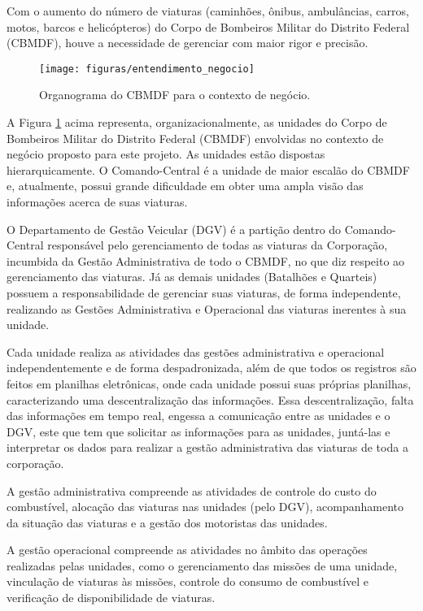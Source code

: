   Com o aumento do número de viaturas (caminhões, ônibus, ambulâncias, carros, motos, barcos e helicópteros) do Corpo de 
  Bombeiros Militar do Distrito Federal (CBMDF), houve a necessidade de gerenciar com maior rigor e precisão.

  \begin{figure}[!htbp]
    \centering
    \texttt{[image: figuras/entendimento\_negocio]}
    \caption{Organograma do CBMDF para o contexto de negócio.}
    \label{entendimento_negocio}
  \end{figure}
  
  A Figura \ref{entendimento_negocio} acima representa, organizacionalmente, as unidades do Corpo de Bombeiros Militar do Distrito Federal (CBMDF)
  envolvidas no contexto de negócio proposto para este projeto. As unidades estão dispostas hierarquicamente. 
  O Comando-Central é a unidade de maior escalão do CBMDF e, atualmente, possui grande dificuldade em obter uma ampla 
  visão das informações acerca de suas viaturas.
  
  O Departamento de Gestão Veicular (DGV) é a partição dentro do Comando-Central responsável pelo gerenciamento de todas 
  as viaturas da Corporação, incumbida da Gestão Administrativa de todo o CBMDF, no que diz respeito ao gerenciamento das 
  viaturas. Já as demais unidades (Batalhões e Quarteis) possuem a responsabilidade de gerenciar suas viaturas, de forma 
  independente, realizando as Gestões Administrativa e Operacional das viaturas inerentes à sua unidade.
  
  Cada unidade realiza as atividades das gestões administrativa e operacional independentemente e de forma despadronizada, 
  além de que todos os registros são feitos em planilhas eletrônicas, onde cada unidade possui suas próprias planilhas, 
  caracterizando uma descentralização das informações. Essa descentralização, falta das informações em tempo real, engessa 
  a comunicação entre as unidades e o DGV, este que tem que solicitar as informações para as unidades, juntá-las e interpretar 
  os dados para realizar a gestão administrativa das viaturas de toda a corporação.
  
  A gestão administrativa compreende as atividades de controle do custo do combustível, alocação das viaturas nas unidades
  (pelo DGV), acompanhamento da situação das viaturas e a gestão dos motoristas das unidades.
  
  A gestão operacional compreende as atividades no âmbito das operações realizadas pelas unidades, como o gerenciamento das 
  missões de uma unidade, vinculação de viaturas às missões, controle do consumo de combustível e verificação de 
  disponibilidade de viaturas.